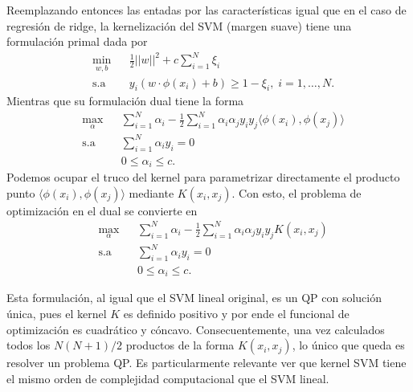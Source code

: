 Reemplazando entonces las entadas por las características igual que en el caso de regresión de ridge, la kernelización del SVM (margen suave) tiene una formulación primal dada por
\begin{equation*}
\begin{aligned}
& \underset{w,b}{\text{min}}
& & \frac{1}{2}||w||^2 + c\sum\limits_{i=1}^{N} \xi_i\\
& \text{s.a}
& & y_i (w\cdot \phi(x_i) +b) \geq 1- \xi_i, \; i = 1, \ldots, N.
\end{aligned}
\end{equation*}
Mientras que su formulación dual tiene la forma
\begin{equation*}
\begin{aligned}
& \underset{\alpha}{\text{max}}
& & \sum\limits_{i=1}^{N}\alpha_i - \frac{1}{2} \sum\limits_{i=1}^{N} \alpha_i \alpha_j y_i y_j \langle\phi(x_i), \phi(x_j)\rangle\\
& \text{s.a}
& & \sum\limits_{i=1}^{N} \alpha_i y_i= 0 \\
& &  &0 \leq \alpha_i \leq c.
\end{aligned}
\end{equation*}
Podemos ocupar el truco del kernel para parametrizar directamente el producto punto $\langle \phi(x_i), \phi(x_j)\rangle$ mediante $K(x_i,x_j)$. Con esto, el problema de optimización en el dual se convierte en 
\begin{equation*}
\begin{aligned}
& \underset{\alpha}{\text{max}}
& & \sum\limits_{i=1}^{N}\alpha_i - \frac{1}{2} \sum\limits_{i=1}^{N} \alpha_i \alpha_j y_i y_j K(x_i, x_j)\\
& \text{s.a}
& & \sum\limits_{i=1}^{N} \alpha_i y_i= 0 \\
& &  &0 \leq \alpha_i \leq c.
\end{aligned}
\end{equation*}

\begin{remark}
Esta formulación, al igual que el SVM lineal original, es un QP  con solución única, pues  el kernel $K$ es definido positivo y por ende el funcional de optimización es cuadrático y cóncavo. Consecuentemente, una vez calculados todos los $N(N+1)/2$ productos de la forma $K(x_i, x_j)$, lo único que queda es resolver un problema QP.  Es particularmente relevante ver que kernel SVM tiene el mismo orden de complejidad computacional que el SVM lineal.
\end{remark}

